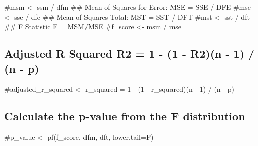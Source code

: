\documentclass[
]{article}
\begin{document}
\#msm \textless- ssm / dfm \#\# Mean of Squares for Error: MSE = SSE /
DFE \#mse \textless- sse / dfe \#\# Mean of Squares Total: MST = SST /
DFT \#mst \textless- sst / dft \#\# F Statistic F = MSM/MSE \#f\_score
\textless- msm / mse

\hypertarget{adjusted-r-squared-r2-1---1---r2n---1-n---p}{%
\subsection{Adjusted R Squared R2 = 1 - (1 - R2)(n - 1) / (n -
p)}\label{adjusted-r-squared-r2-1---1---r2n---1-n---p}}

\#adjusted\_r\_squared \textless- r\_squared = 1 - (1 - r\_squared)(n -
1) / (n - p)

\hypertarget{calculate-the-p-value-from-the-f-distribution}{%
\subsection{Calculate the p-value from the F
distribution}\label{calculate-the-p-value-from-the-f-distribution}}

\#p\_value \textless- pf(f\_score, dfm, dft, lower.tail=F)
\end{document}

